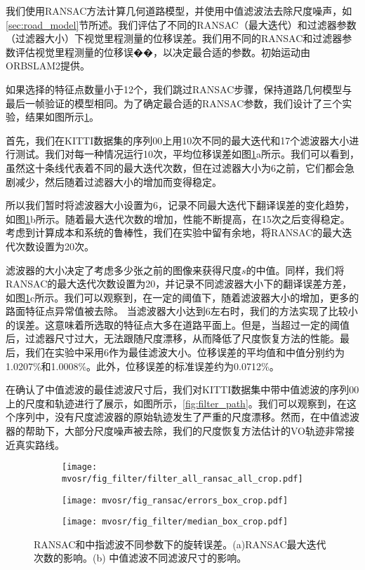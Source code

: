 我们使用RANSAC方法计算几何道路模型，并使用中值滤波法去除尺度噪声，如\ref{sec:road_model}节所述。我们评估了不同的RANSAC（最大迭代）和过滤器参数（过滤器大小）下视觉里程测量的位移误差。我们用不同的RANSAC和过滤器参数评估视觉里程测量的位移误��，以决定最合适的参数。初始运动由ORB\-SLAM2提供。

如果选择的特征点数量小于12个，我们跳过RANSAC步骤，保持道路几何模型与最后一帧验证的模型相同。为了确定最合适的RANSAC参数，我们设计了三个实验，结果如图所示\ref{fig:filter_method}。

首先，我们在KITTI数据集的序列00上用10次不同的最大迭代和17个滤波器大小进行测试。我们对每一种情况运行10次，平均位移误差如图\ref{fig:filter_method}a所示。我们可以看到，虽然这十条线代表着不同的最大迭代次数，但在过滤器大小为6之前，它们都会急剧减少，然后随着过滤器大小的增加而变得稳定。

所以我们暂时将滤波器大小设置为6，记录不同最大迭代下翻译误差的变化趋势，如图\ref{fig:filter_method}b所示。随着最大迭代次数的增加，性能不断提高，在15次之后变得稳定。考虑到计算成本和系统的鲁棒性，我们在实验中留有余地，将RANSAC的最大迭代次数设置为20次。

滤波器的大小决定了考虑多少张之前的图像来获得尺度$s$的中值。同样，我们将RANSAC的最大迭代次数设置为20，并记录不同滤波器大小下的翻译误差方差，如图\ref{fig:filter_method}c所示。我们可以观察到，在一定的阈值下，随着滤波器大小的增加，更多的路面特征点异常值被去除。
当滤波器大小达到6左右时，我们的方法实现了比较小的误差。这意味着所选取的特征点大多在道路平面上。但是，当超过一定的阈值后，过滤器尺寸过大，无法跟随尺度漂移，从而降低了尺度恢复方法的性能。最后，我们在实验中采用6作为最佳滤波大小。位移误差的平均值和中值分别约为1.0207\%和1.0008\%。此外，位移误差的标准误差约为0.0712\%。

在确认了中值滤波的最佳滤波尺寸后，我们对KITTI数据集中带中值滤波的序列00上的尺度和轨迹进行了展示，如图所示，\ref{fig:filter_path}。我们可以观察到，在这个序列中，没有尺度滤波器的原始轨迹发生了严重的尺度漂移。然而，在中值滤波器的帮助下，大部分尺度噪声被去除，我们的尺度恢复方法估计的VO轨迹非常接近真实路线。


\begin{figure}\centering
    \vspace{4mm}
    \begin{subfigure}[h]{0.8\textwidth}
    \texttt{[image: mvosr/fig\_filter/filter\_all\_ransac\_all\_crop.pdf]}
    \caption{}
    \vspace{3mm}
    \end{subfigure}
    \begin{subfigure}[h]{0.8\textwidth}
    \texttt{[image: mvosr/fig\_ransac/errors\_box\_crop.pdf]}
    \caption{}
    \vspace{3mm}
    \end{subfigure}
    \begin{subfigure}[h]{0.8\textwidth}
    \texttt{[image: mvosr/fig\_filter/median\_box\_crop.pdf]}
    \caption{}
    \vspace{3mm}
    \end{subfigure}
    \caption{RANSAC和中指滤波不同参数下的旋转误差。(a)RANSAC最大迭代次数的影响。(b) 中值滤波不同滤波尺寸的影响。}
    \label{fig:filter_method}
\end{figure}
    

